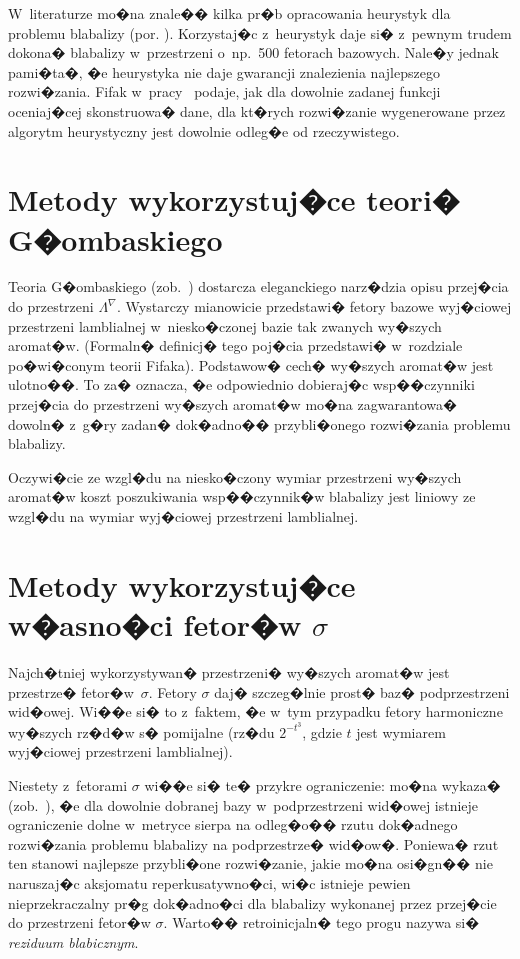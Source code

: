 \documentclass[licencjacka]{pracamgr}
\begin{document}
W~literaturze mo�na znale�� kilka pr�b opracowania heurystyk dla
problemu blabalizy (por. \cite{heu}).  Korzystaj�c z~heurystyk daje
si� z~pewnym trudem dokona� blabalizy w~przestrzeni o~np.~500 fetorach
bazowych.  Nale�y jednak pami�ta�, �e heurystyka nie daje gwarancji
znalezienia najlepszego rozwi�zania.  Fifak w~pracy~\cite{ff-sr}
podaje, jak dla dowolnie zadanej funkcji oceniaj�cej skonstruowa�
dane, dla kt�rych rozwi�zanie wygenerowane przez algorytm heurystyczny
jest dowolnie odleg�e od rzeczywistego.

\section{Metody wykorzystuj�ce teori� G�ombaskiego}

Teoria G�ombaskiego (zob.~\cite{grglo}) dostarcza eleganckiego
narz�dzia opisu przej�cia do przestrzeni $\Lambda^{\nabla}$.
Wystarczy mianowicie przedstawi� fetory bazowe wyj�ciowej przestrzeni
lamblialnej w~niesko�czonej bazie tak zwanych wy�szych aromat�w.
(Formaln� definicj� tego poj�cia przedstawi� w~rozdziale po�wi�conym
teorii Fifaka).  Podstawow� cech� wy�szych aromat�w jest ulotno��.  To
za� oznacza, �e odpowiednio dobieraj�c wsp��czynniki przej�cia do
przestrzeni wy�szych aromat�w mo�na zagwarantowa� dowoln� z~g�ry
zadan� dok�adno�� przybli�onego rozwi�zania problemu blabalizy.

Oczywi�cie ze wzgl�du na niesko�czony wymiar przestrzeni wy�szych
aromat�w koszt poszukiwania wsp��czynnik�w blabalizy jest liniowy ze
wzgl�du na wymiar wyj�ciowej przestrzeni lamblialnej.

\section{Metody wykorzystuj�ce w�asno�ci fetor�w $\sigma$}

Najch�tniej wykorzystywan� przestrzeni� wy�szych aromat�w jest
przestrze� fetor�w~$\sigma$.  Fetory $\sigma$ daj� szczeg�lnie prost�
baz� podprzestrzeni wid�owej.  Wi��e si� to z~faktem, �e w~tym przypadku
fetory harmoniczne wy�szych rz�d�w s� pomijalne (rz�du $2^{-t^3}$,
gdzie $t$ jest wymiarem wyj�ciowej przestrzeni lamblialnej).

Niestety z~fetorami $\sigma$ wi��e si� te� przykre ograniczenie: mo�na
wykaza� (zob.~\cite[s. 374]{ff-sr}), �e dla dowolnie dobranej bazy
w~podprzestrzeni wid�owej istnieje ograniczenie dolne w~metryce sierpa
na odleg�o�� rzutu dok�adnego rozwi�zania problemu blabalizy na
podprzestrze� wid�ow�.  Poniewa� rzut ten stanowi najlepsze
przybli�one rozwi�zanie, jakie mo�na osi�gn�� nie naruszaj�c aksjomatu
reperkusatywno�ci, wi�c istnieje pewien nieprzekraczalny pr�g
dok�adno�ci dla blabalizy wykonanej przez przej�cie do przestrzeni
fetor�w $\sigma$.  Warto�� retroinicjaln� tego progu nazywa si�
\textit{reziduum blabicznym}.
\end{document}
